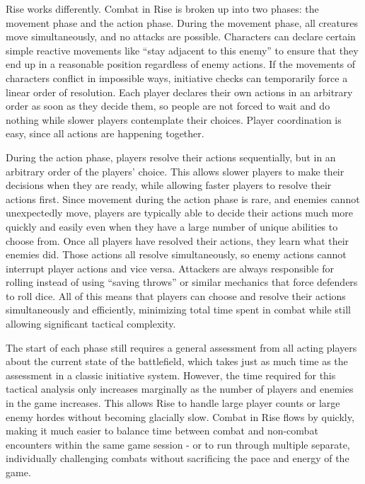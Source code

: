     Rise works differently.
    Combat in Rise is broken up into two phases: the movement phase and the action phase.
    During the movement phase, all creatures move simultaneously, and no attacks are possible.
    Characters can declare certain simple reactive movements like ``stay adjacent to this enemy'' to ensure that they end up in a reasonable position regardless of enemy actions.
    If the movements of characters conflict in impossible ways, initiative checks can temporarily force a linear order of resolution.
    Each player declares their own actions in an arbitrary order as soon as they decide them, so people are not forced to wait and do nothing while slower players contemplate their choices.
    Player coordination is easy, since all actions are happening together.

    During the action phase, players resolve their actions sequentially, but in an arbitrary order of the players' choice.
    This allows slower players to make their decisions when they are ready, while allowing faster players to resolve their actions first.
    Since movement during the action phase is rare, and enemies cannot unexpectedly move, players are typically able to decide their actions much more quickly and easily even when they have a large number of unique abilities to choose from.
    Once all players have resolved their actions, they learn what their enemies did.
    Those actions all resolve simultaneously, so enemy actions cannot interrupt player actions and vice versa.
    Attackers are always responsible for rolling instead of using ``saving throws'' or similar mechanics that force defenders to roll dice.
    All of this means that players can choose and resolve their actions simultaneously and efficiently, minimizing total time spent in combat while still allowing significant tactical complexity.

    The start of each phase still requires a general assessment from all acting players about the current state of the battlefield, which takes just as much time as the assessment in a classic initiative system.
    However, the time required for this tactical analysis only increases marginally as the number of players and enemies in the game increases.
    This allows Rise to handle large player counts or large enemy hordes without becoming glacially slow.
    Combat in Rise flows by quickly, making it much easier to balance time between combat and non-combat encounters within the same game session - or to run through multiple separate, individually challenging combats without sacrificing the pace and energy of the game.

